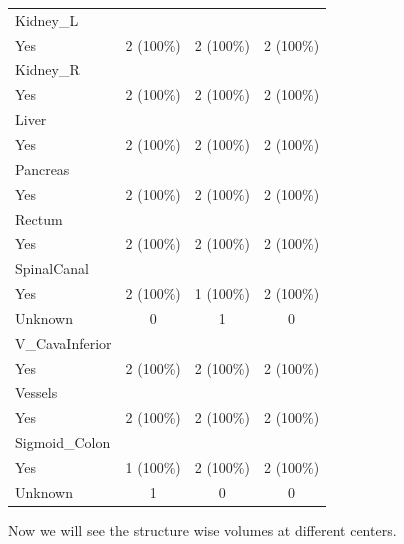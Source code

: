 \documentclass[
  letterpaper,
  DIV=11,
  numbers=noendperiod]{scrartcl}
\begin{document}
\begin{longtable}[]{@{}lccc@{}}
Kidney\_L & & & \\
Yes & 2 (100\%) & 2 (100\%) & 2 (100\%) \\
Kidney\_R & & & \\
Yes & 2 (100\%) & 2 (100\%) & 2 (100\%) \\
Liver & & & \\
Yes & 2 (100\%) & 2 (100\%) & 2 (100\%) \\
Pancreas & & & \\
Yes & 2 (100\%) & 2 (100\%) & 2 (100\%) \\
Rectum & & & \\
Yes & 2 (100\%) & 2 (100\%) & 2 (100\%) \\
SpinalCanal & & & \\
Yes & 2 (100\%) & 1 (100\%) & 2 (100\%) \\
Unknown & 0 & 1 & 0 \\
V\_CavaInferior & & & \\
Yes & 2 (100\%) & 2 (100\%) & 2 (100\%) \\
Vessels & & & \\
Yes & 2 (100\%) & 2 (100\%) & 2 (100\%) \\
Sigmoid\_Colon & & & \\
Yes & 1 (100\%) & 2 (100\%) & 2 (100\%) \\
Unknown & 1 & 0 & 0 \\
\end{longtable}

Now we will see the structure wise volumes at different centers.
\end{document}
